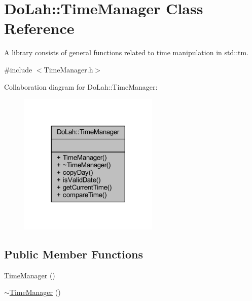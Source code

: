 \hypertarget{class_do_lah_1_1_time_manager}{}\section{Do\+Lah\+:\+:Time\+Manager Class Reference}
\label{class_do_lah_1_1_time_manager}


A library consists of general functions related to time manipulation in std\+::tm.  




{\ttfamily \#include $<$Time\+Manager.\+h$>$}



Collaboration diagram for Do\+Lah\+:\+:Time\+Manager\+:\nopagebreak
\begin{figure}[H]
\begin{center}
\leavevmode
\includegraphics[width=189pt]{class_do_lah_1_1_time_manager__coll__graph}
\end{center}
\end{figure}
\subsection*{Public Member Functions}
\begin{DoxyCompactItemize}
\item 
\hyperlink{class_do_lah_1_1_time_manager_a0c71519ec445cbdc8dcb75d790d996cf}{Time\+Manager} ()
\item 
\hyperlink{class_do_lah_1_1_time_manager_a3f53ee3119cfdbcb1fadbd5e91fd48d1}{$\sim$\+Time\+Manager} ()
\end{DoxyCompactItemize}
